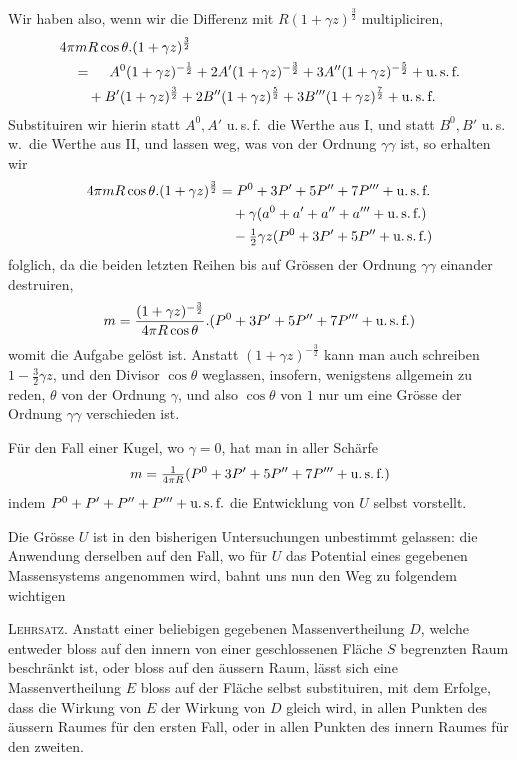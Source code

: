 Wir haben also, wenn wir die Differenz mit $R(1+\gamma z)^{\frac32}$ multipliciren,
\[
\begin{aligned}
&4\pi mR\cos\theta.(1+\gamma z)^{\frac32}\\
&\quad=\phantom{{}+{}}A^0(1+\gamma z)^{-\frac12}+2A'(1+\gamma z)^{-\frac32}+3A''(1+\gamma z)^{-\frac52}+\text{u.\,s.\,f.}\\
&\qquad+B'(1+\gamma z)^{\frac32}+2B''(1+\gamma z)^{\frac52}+3B'''(1+\gamma z)^{\frac72}+\text{u.\,s.\,f.}
\end{aligned}
\]
Substituiren wir hierin statt $A^0,A'$ u.\,s.\,f.\ die Werthe aus I, und statt $B^0,B'$ u.\,s.\,w.\ die Werthe aus II, und lassen weg, was von der Ordnung $\gamma\gamma$ ist, so erhalten wir
\[
\begin{aligned}
4\pi mR\cos\theta.(1+\gamma z)^{\frac32}&=P^0+3P'+5P''+7P'''+\text{u.\,s.\,f.}\\
&\quad+\gamma(a^0+a'+a''+a'''+\text{u.\,s.\,f.})\\
&\quad-\tfrac12\gamma z(P^0+3P'+5P''+\text{u.\,s.\,f.})
\end{aligned}
\]
folglich, da die beiden letzten Reihen bis auf Grössen der Ordnung $\gamma\gamma$ einander destruiren,
\[
m=\frac{(1+\gamma z)^{-\frac32}}{4\pi R\cos\theta}.(P^0+3P'+5P''+7P'''+\text{u.\,s.\,f.})
\]
womit die Aufgabe gelöst ist. Anstatt $(1+\gamma z)^{-\frac32}$ kann man auch schreiben $1-\frac32\gamma z$, und den Divisor $\cos\theta$ weglassen, insofern, wenigstens allgemein zu reden, $\theta$ von der Ordnung $\gamma$, und also $\cos\theta$ von $1$ nur um eine Grösse der Ordnung $\gamma\gamma$ verschieden ist.

Für den Fall einer Kugel, wo $\gamma=0$, hat man in aller Schärfe
\[
m=\tfrac1{4\pi R}(P^0+3P'+5P''+7P'''+\text{u.\,s.\,f.})
\]
indem $P^0+P'+P''+P'''+\text{u.\,s.\,f.}$ die Entwicklung von $U$ selbst vorstellt.

Die Grösse $U$ ist in den bisherigen Untersuchungen unbestimmt gelassen: die Anwendung derselben auf den Fall, wo für $U$ das Potential eines gegebenen Massensystems angenommen wird, bahnt uns nun den Weg zu folgendem wichtigen

\textsc{Lehrsatz.} Anstatt einer beliebigen gegebenen Massenvertheilung $D$, welche entweder bloss auf den innern von einer geschlossenen Fläche $S$ begrenzten Raum beschränkt ist, oder bloss auf den äussern Raum, lässt sich eine Massenvertheilung $E$ bloss auf der Fläche selbst substituiren, mit dem Erfolge, dass die
Wirkung von $E$ der Wirkung von $D$ gleich wird, in allen Punkten des äussern Raumes für den ersten Fall, oder in allen Punkten des innern Raumes für den zweiten.


